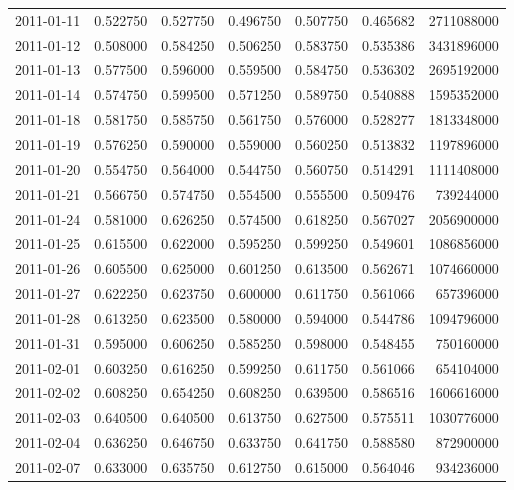 \begin{tabular}{lrrrrrr}
2011-01-11 &    0.522750 &    0.527750 &    0.496750 &    0.507750 &    0.465682 &  2711088000 \\
2011-01-12 &    0.508000 &    0.584250 &    0.506250 &    0.583750 &    0.535386 &  3431896000 \\
2011-01-13 &    0.577500 &    0.596000 &    0.559500 &    0.584750 &    0.536302 &  2695192000 \\
2011-01-14 &    0.574750 &    0.599500 &    0.571250 &    0.589750 &    0.540888 &  1595352000 \\
2011-01-18 &    0.581750 &    0.585750 &    0.561750 &    0.576000 &    0.528277 &  1813348000 \\
2011-01-19 &    0.576250 &    0.590000 &    0.559000 &    0.560250 &    0.513832 &  1197896000 \\
2011-01-20 &    0.554750 &    0.564000 &    0.544750 &    0.560750 &    0.514291 &  1111408000 \\
2011-01-21 &    0.566750 &    0.574750 &    0.554500 &    0.555500 &    0.509476 &   739244000 \\
2011-01-24 &    0.581000 &    0.626250 &    0.574500 &    0.618250 &    0.567027 &  2056900000 \\
2011-01-25 &    0.615500 &    0.622000 &    0.595250 &    0.599250 &    0.549601 &  1086856000 \\
2011-01-26 &    0.605500 &    0.625000 &    0.601250 &    0.613500 &    0.562671 &  1074660000 \\
2011-01-27 &    0.622250 &    0.623750 &    0.600000 &    0.611750 &    0.561066 &   657396000 \\
2011-01-28 &    0.613250 &    0.623500 &    0.580000 &    0.594000 &    0.544786 &  1094796000 \\
2011-01-31 &    0.595000 &    0.606250 &    0.585250 &    0.598000 &    0.548455 &   750160000 \\
2011-02-01 &    0.603250 &    0.616250 &    0.599250 &    0.611750 &    0.561066 &   654104000 \\
2011-02-02 &    0.608250 &    0.654250 &    0.608250 &    0.639500 &    0.586516 &  1606616000 \\
2011-02-03 &    0.640500 &    0.640500 &    0.613750 &    0.627500 &    0.575511 &  1030776000 \\
2011-02-04 &    0.636250 &    0.646750 &    0.633750 &    0.641750 &    0.588580 &   872900000 \\
2011-02-07 &    0.633000 &    0.635750 &    0.612750 &    0.615000 &    0.564046 &   934236000 \\

\end{tabular}

